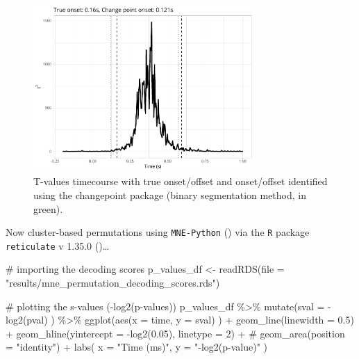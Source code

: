 \documentclass[
  doc,
  floatsintext,
  longtable,
  a4paper,
  nolmodern,
  notxfonts,
  notimes,
  colorlinks=true,linkcolor=blue,citecolor=blue,urlcolor=blue]{apa7}
\newenvironment{Shaded}{\begin{snugshade}}{\end{snugshade}}
\newcommand{\AttributeTok}[1]{\textcolor[rgb]{0.40,0.45,0.13}{#1}}
\newcommand{\CommentTok}[1]{\textcolor[rgb]{0.37,0.37,0.37}{#1}}
\newcommand{\DecValTok}[1]{\textcolor[rgb]{0.68,0.00,0.00}{#1}}
\newcommand{\FloatTok}[1]{\textcolor[rgb]{0.68,0.00,0.00}{#1}}
\newcommand{\FunctionTok}[1]{\textcolor[rgb]{0.28,0.35,0.67}{#1}}
\newcommand{\NormalTok}[1]{\textcolor[rgb]{0.00,0.23,0.31}{#1}}
\newcommand{\OtherTok}[1]{\textcolor[rgb]{0.00,0.23,0.31}{#1}}
\newcommand{\SpecialCharTok}[1]{\textcolor[rgb]{0.37,0.37,0.37}{#1}}
\newcommand{\StringTok}[1]{\textcolor[rgb]{0.13,0.47,0.30}{#1}}
\begin{document}
\begin{figure}[H]

\caption{T-values timecourse with true onset/offset and onset/offset
identified using the changepoint package (binary segmentation method, in
green).}

{\centering \includegraphics[width=0.75\textwidth,height=\textheight]{brms_meeg_files/figure-pdf/changepoint-1.pdf}

}

\end{figure}%

Now cluster-based permutations using \texttt{MNE-Python}
() via the \texttt{R} package
\texttt{reticulate} v 1.35.0 ()\ldots{}

\begin{Shaded}
\begin{Highlighting}[]
\CommentTok{\# importing the decoding scores}
\NormalTok{p\_values\_df }\OtherTok{\textless{}{-}} \FunctionTok{readRDS}\NormalTok{(}\AttributeTok{file =} \StringTok{"results/mne\_permutation\_decoding\_scores.rds"}\NormalTok{)}

\CommentTok{\# plotting the s{-}values ({-}log2(p{-}values))}
\NormalTok{p\_values\_df }\SpecialCharTok{\%\textgreater{}\%}
    \FunctionTok{mutate}\NormalTok{(}\AttributeTok{sval =} \SpecialCharTok{{-}}\FunctionTok{log2}\NormalTok{(pval) ) }\SpecialCharTok{\%\textgreater{}\%}
    \FunctionTok{ggplot}\NormalTok{(}\FunctionTok{aes}\NormalTok{(}\AttributeTok{x =}\NormalTok{ time, }\AttributeTok{y =}\NormalTok{ sval) ) }\SpecialCharTok{+}
    \FunctionTok{geom\_line}\NormalTok{(}\AttributeTok{linewidth =} \FloatTok{0.5}\NormalTok{) }\SpecialCharTok{+}
    \FunctionTok{geom\_hline}\NormalTok{(}\AttributeTok{yintercept =} \SpecialCharTok{{-}}\FunctionTok{log2}\NormalTok{(}\FloatTok{0.05}\NormalTok{), }\AttributeTok{linetype =} \DecValTok{2}\NormalTok{) }\SpecialCharTok{+}
    \CommentTok{\# geom\_area(position = "identity") +}
    \FunctionTok{labs}\NormalTok{(}
        \AttributeTok{x =} \StringTok{"Time (ms)"}\NormalTok{,}
        \AttributeTok{y =} \StringTok{"{-}log2(p{-}value)"}
\NormalTok{        )}
\end{Highlighting}
\end{Shaded}
\end{document}
